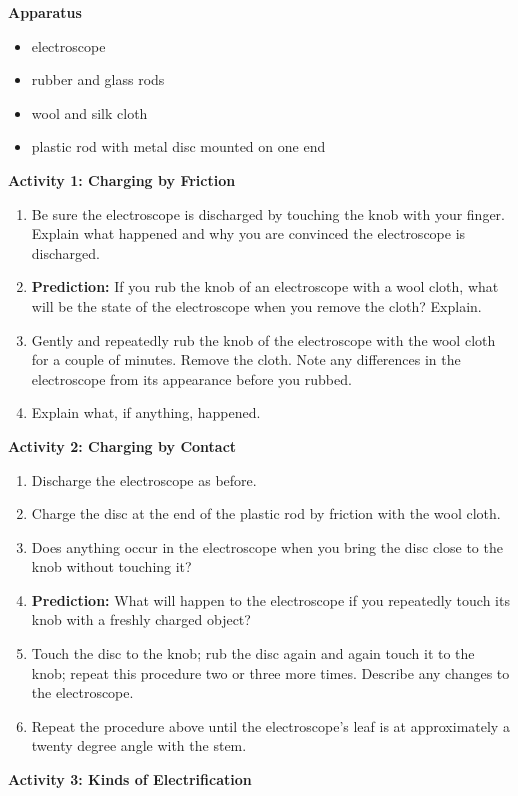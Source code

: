 \textbf{Apparatus}

\begin{itemize}
\item electroscope
\item rubber and glass rods
\item wool and silk cloth
\item plastic rod with metal disc mounted on one end
\end{itemize}
\textbf{Activity 1: Charging by Friction}

\begin{enumerate}
\item Be sure the electroscope is discharged by touching the knob with your
finger. Explain what happened and why you are convinced the electroscope
is discharged.\vspace{15mm}

\item \textbf{Prediction:} If you rub the knob of an electroscope with a
wool cloth, what will be the state of the electroscope when you remove
the cloth? Explain.\vspace{15mm}

\item Gently and repeatedly rub the knob of the electroscope with the wool cloth for a couple of minutes. Remove the cloth. Note any differences in the electroscope from its appearance before you rubbed.\vspace{15mm}

\item Explain what, if anything, happened.\vspace{15mm}

\end{enumerate}
\textbf{Activity 2: Charging by Contact}

\begin{enumerate}
\item Discharge the electroscope as before.
\item Charge the disc at the end of the plastic rod by friction with
the wool cloth.
\item Does anything occur in the electroscope when you bring the disc close
to the knob without touching it?\vspace{15mm}

\item \textbf{Prediction:} What will happen to the electroscope if you repeatedly
touch its knob with a freshly charged object?\vspace{15mm}

\item Touch the disc to the knob; rub the disc again and again touch it
to the knob; repeat this procedure two or three more times. Describe
any changes to the electroscope.\vspace{15mm}

\item Repeat the procedure above until the electroscope's leaf is at approximately
a twenty degree angle with the stem.
\end{enumerate}
\textbf{Activity 3: Kinds of Electrification}

